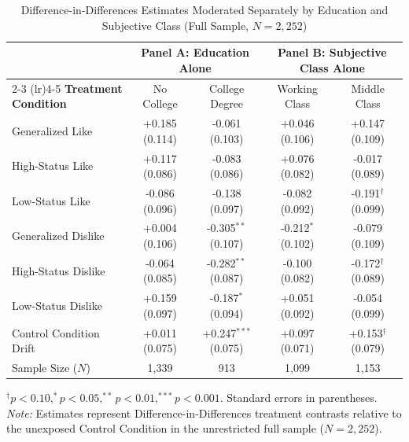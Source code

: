 \begin{table}[ht!]
\centering
\small
\caption{Difference-in-Differences Estimates Moderated Separately by Education and Subjective Class (Full Sample, $N = 2{,}252$)}
\label{tbl:did_edu_class_full}
\setlength{\tabcolsep}{2.0pt}
\begin{tabular*}{\linewidth}{@{\extracolsep{\fill}}lcccc@{}}
\toprule
& \multicolumn{2}{c}{\textbf{Panel A: Education Alone}} & \multicolumn{2}{c}{\textbf{Panel B: Subjective Class Alone}} \\
\cmidrule(lr){2-3} \cmidrule(lr){4-5}
\textbf{Treatment Condition} & No College & College Degree & Working Class & Middle Class \\
\midrule
Generalized Like & +0.185 (0.114) & -0.061 (0.103) & +0.046 (0.106) & +0.147 (0.109) \\
High-Status Like & +0.117 (0.086) & -0.083 (0.086) & +0.076 (0.082) & -0.017 (0.089) \\
Low-Status Like & -0.086 (0.096) & -0.138 (0.097) & -0.082 (0.092) & -0.191$^{\dagger}$ (0.099) \\
Generalized Dislike & +0.004 (0.106) & -0.305$^{**}$ (0.107) & -0.212$^{*}$ (0.102) & -0.079 (0.109) \\
High-Status Dislike & -0.064 (0.085) & -0.282$^{**}$ (0.087) & -0.100 (0.082) & -0.172$^{\dagger}$ (0.089) \\
Low-Status Dislike & +0.159 (0.097) & -0.187$^{*}$ (0.094) & +0.051 (0.092) & -0.054 (0.099) \\
\midrule
Control Condition Drift & +0.011 (0.075) & +0.247$^{***}$ (0.075) & +0.097 (0.071) & +0.153$^{\dagger}$ (0.079) \\
Sample Size ($N$) & 1,339 & 913 & 1,099 & 1,153 \\
\bottomrule
\end{tabular*}
\begin{minipage}{\linewidth}
\vspace{4pt}
\footnotesize
$^{\dagger}p < 0.10, ^{*}p < 0.05, ^{**}p < 0.01, ^{***}p < 0.001$. Standard errors in parentheses. \newline
\textit{Note:} Estimates represent Difference-in-Differences treatment contrasts relative to the unexposed Control Condition in the unrestricted full sample ($N = 2{,}252$).
\end{minipage}
\end{table}
